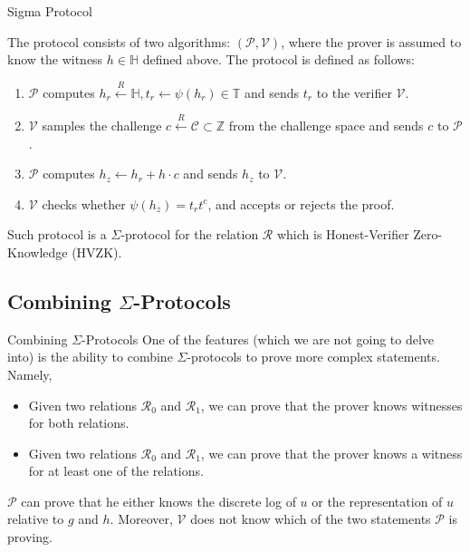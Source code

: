 \documentclass[xcolor={usenames,dvipsnames}]{beamer}
\begin{document}
    \begin{frame}{Sigma Protocol}
        \begin{definition}
            The protocol consists of two algorithms: $(\mathcal{P}, \mathcal{V})$, where the prover is assumed to know the witness $h \in \mathbb{H}$ defined above. The protocol is defined as follows:\pause
            \begin{enumerate}
                \item $\mathcal{P}$ computes $h_r \xleftarrow{R} \mathbb{H}, t_r \gets \psi(h_r) \in \mathbb{T}$ and sends $t_r$ to the verifier $\mathcal{V}$.\pause
                \item $\mathcal{V}$ samples the challenge $c \xleftarrow{R} \mathcal{C} \subset \mathbb{Z}$ from the challenge space and sends $c$ to $\mathcal{P}$.\pause
                \item $\mathcal{P}$ computes $h_z \gets h_r + h\cdot c$ and sends $h_z$ to $\mathcal{V}$.\pause
                \item $\mathcal{V}$ checks whether $\psi(h_z) = t_r t^c$, and accepts or rejects the proof.\pause
            \end{enumerate}
        \end{definition}

        \begin{theorem}
            Such protocol is a $\Sigma$-protocol for the relation $\mathcal{R}$ which is Honest-Verifier Zero-Knowledge (HVZK).
        \end{theorem}
    \end{frame}

    \subsection{Combining $\Sigma$-Protocols}

    \begin{frame}{Combining $\Sigma$-Protocols}
        One of the features (which we are not going to delve into) is the ability to combine $\Sigma$-protocols to prove more complex statements. \pause Namely,
        \begin{itemize}
            \item Given two relations $\mathcal{R}_0$ and $\mathcal{R}_1$, we can prove that the prover knows witnesses for both relations.\pause
            \item Given two relations $\mathcal{R}_0$ and $\mathcal{R}_1$, we can prove that the prover knows a witness for at least one of the relations. \pause
        \end{itemize}

        \begin{example}
            $\mathcal{P}$ can prove that he either knows the discrete log of $u$ or the representation of $u$ relative to $g$ and $h$. Moreover, $\mathcal{V}$ does not know which of the two statements $\mathcal{P}$ is proving.
        \end{example}
    \end{frame}
\end{document}
